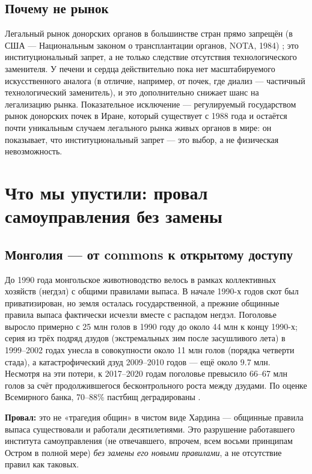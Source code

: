 \documentclass[11pt]{article}
\begin{document}
\subsection{Почему не рынок}
Легальный рынок донорских органов в большинстве стран прямо запрещён (в США — Национальным законом о трансплантации органов, NOTA, 1984) \cite{nota1984}; это институциональный запрет, а не только следствие отсутствия технологического заменителя. У печени и сердца действительно пока нет масштабируемого искусственного аналога (в отличие, например, от почек, где диализ — частичный технологический заменитель), и это дополнительно снижает шанс на легализацию рынка. Показательное исключение — регулируемый государством рынок донорских почек в Иране, который существует с 1988 года и остаётся почти уникальным случаем легального рынка живых органов в мире: он показывает, что институциональный запрет — это выбор, а не физическая невозможность.

\section{Что мы упустили: провал самоуправления без замены}

\subsection{Монголия — от commons к открытому доступу}
До 1990 года монгольское животноводство велось в рамках коллективных хозяйств (негдэл) с общими правилами выпаса. В начале 1990-х годов скот был приватизирован, но земля осталась государственной, а прежние общинные правила выпаса фактически исчезли вместе с распадом негдэл. Поголовье выросло примерно с 25 млн голов в 1990 году до около 44 млн к концу 1990-х; серия из трёх подряд дзудов (экстремальных зим после засушливого лета) в 1999--2002 годах унесла в совокупности около 11 млн голов (порядка четверти стада), а катастрофический дзуд 2009--2010 годов — ещё около 9.7 млн. Несмотря на эти потери, к 2017--2020 годам поголовье превысило 66--67 млн голов за счёт продолжившегося бесконтрольного роста между дзудами. По оценке Всемирного банка, 70--88\% пастбищ деградированы \cite{worldbank2022mongolia,fao2017mongolia}.

\textbf{Провал:} это не «трагедия общин» в чистом виде Хардина — общинные правила выпаса существовали и работали десятилетиями. Это разрушение работавшего института самоуправления (не отвечавшего, впрочем, всем восьми принципам Остром в полной мере) \emph{без замены его новыми правилами}, а не отсутствие правил как таковых.
\end{document}
